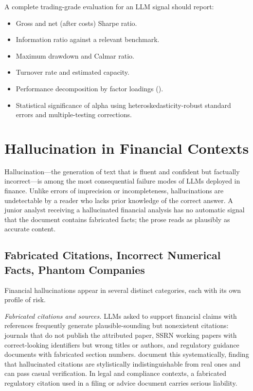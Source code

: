 A complete trading-grade evaluation for an LLM signal should report:
\begin{itemize}
  \item Gross and net (after costs) Sharpe ratio.
  \item Information ratio against a relevant benchmark.
  \item Maximum drawdown and Calmar ratio.
  \item Turnover rate and estimated capacity.
  \item Performance decomposition by factor loadings ().
  \item Statistical significance of alpha using heteroskedasticity-robust standard errors
        and multiple-testing corrections.
\end{itemize}

\section{Hallucination in Financial Contexts}
\label{sec:ch13-hallucination-financial-contexts}

Hallucination---the generation of text that is fluent and confident but factually
incorrect---is among the most consequential failure modes of LLMs deployed in finance.
Unlike errors of imprecision or incompleteness, hallucinations are undetectable by a
reader who lacks prior knowledge of the correct answer. A junior analyst receiving a
hallucinated financial analysis has no automatic signal that the document contains
fabricated facts; the prose reads as plausibly as accurate content.

\subsection{Fabricated Citations, Incorrect Numerical Facts, Phantom Companies}
\label{sec:ch13-fabricated-citations-phantom-companies}

Financial hallucinations appear in several distinct categories, each with its own
profile of risk.

\emph{Fabricated citations and sources.} LLMs asked to support financial claims with
references frequently generate plausible-sounding but nonexistent citations: journals
that do not publish the attributed paper, SSRN working papers with correct-looking
identifiers but wrong titles or authors, and regulatory guidance documents with
fabricated section numbers. \citet{bang2023multitask} document this systematically,
finding that hallucinated citations are stylistically indistinguishable from real ones
and can pass casual verification. In legal and compliance contexts, a fabricated
regulatory citation used in a filing or advice document carries serious liability.

